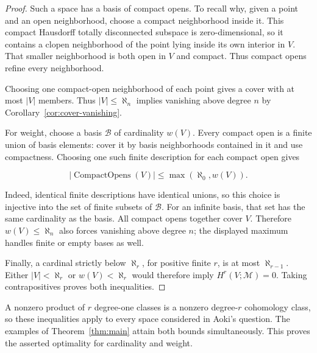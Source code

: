 \begin{proof}
Such a space has a basis of compact opens. To recall why, given a point
and an open neighborhood, choose a compact neighborhood inside it. This
compact Hausdorff totally disconnected subspace is zero-dimensional, so
it contains a clopen neighborhood of the point lying inside its own
interior in \(V\). That smaller neighborhood is both open in \(V\) and
compact. Thus compact opens refine every neighborhood.

Choosing one compact-open
neighborhood of each point gives a cover with at most \(|V|\) members.
Thus \(|V|\leq\aleph_n\) implies vanishing above degree \(n\) by
Corollary~\ref{cor:cover-vanishing}.

For weight, choose a basis \(\mathcal B\) of cardinality \(w(V)\).
Every compact open is a finite union of basis elements: cover it by basis
neighborhoods contained in it and use compactness. Choosing one such
finite description for each compact open gives

\[
|\operatorname{CompactOpens}(V)|
\leq\max(\aleph_0,w(V)).
\]

Indeed, identical finite descriptions have identical unions, so this
choice is injective into the set of finite subsets of \(\mathcal B\).
For an infinite basis, that set has the same cardinality as the basis.
All compact opens together cover \(V\). Therefore \(w(V)\leq\aleph_n\)
also forces vanishing above degree \(n\); the displayed maximum handles
finite or empty bases as well.

Finally, a cardinal strictly below \(\aleph_r\), for positive finite
\(r\), is at most \(\aleph_{r-1}\). Either \(|V|<\aleph_r\) or
\(w(V)<\aleph_r\) would therefore imply \(H^r(V;\mathcal M)=0\).
Taking contrapositives proves both inequalities.
\end{proof}

A nonzero product of \(r\) degree-one classes is a nonzero degree-\(r\)
cohomology class, so these inequalities apply to every space considered in
Aoki's question. The examples of Theorem~\ref{thm:main} attain both bounds
simultaneously. This proves the asserted optimality for cardinality and
weight.

